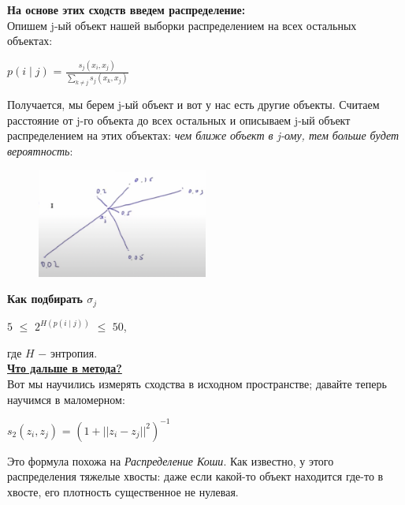             \textbf{На основе этих сходств введем распределение:}\\

            Опишем j-ый объект нашей выборки распределением на всех остальных объектах:
            \begin{center}
            \large
                $p(i \mid j)$ = $\frac{s_j(x_i, x_j)}{\sum\limits_{k \neq j}s_j(x_k, x_j)}$
            \end{center}

            Получается, мы берем j-ый объект и вот у нас есть другие объекты. Считаем расстояние от j-го объекта до всех остальных и описываем j-ый объект распределением на этих объектах: \textit{чем ближе объект в j-ому, тем больше будет вероятность}: 
            \begin{figure}[H]
                \centering
                \includegraphics[width=0.5\textwidth]{images/13lecture/t-SNE.png}
            \end{figure}


            \textbf{Как подбирать $\sigma_j$}
            \begin{center}
            \large
                $5$ $\leq$ $2^{H(p(i \mid j))}$ $\leq$ $50$,
            \end{center}
            где $H$ $-$ энтропия.\\

            \underline{\textbf{Что дальше в метода?}}\\

            Вот мы научились измерять сходства в исходном пространстве; давайте теперь научимся в маломерном:
            \begin{center}
            \large
                $s_2(z_i, z_j)$ = $(1 + ||z_i - z_j||^2)^{-1}$
            \end{center}
            Это формула похожа на \textit{Распределение Коши}. Как известно, у этого распределения тяжелые хвосты: даже если какой-то объект находится где-то в хвосте, его плотность существенное не нулевая. \\

